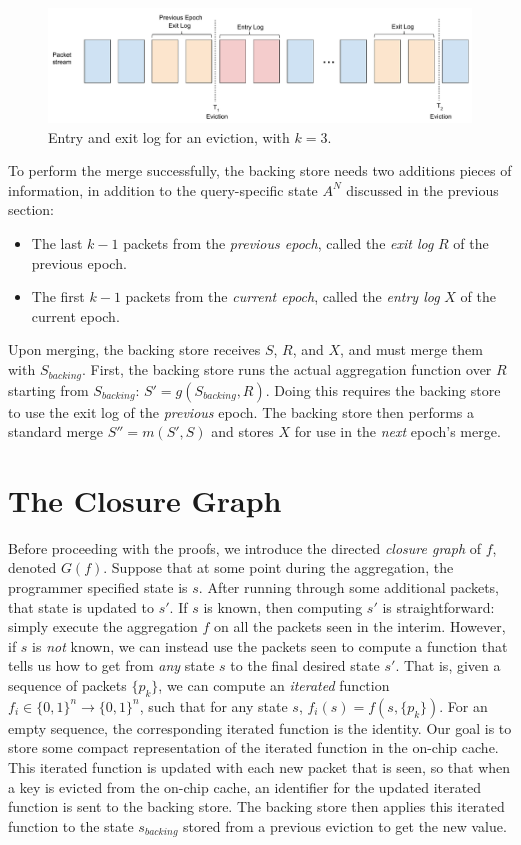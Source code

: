 \begin{figure}[h]
\centering
\includegraphics[width=0.7\linewidth]{pq_merge_tr_bph.pdf}
\caption{Entry and exit log for an eviction, with $k = 3$.}
\label{fig:bph-merge}
\end{figure}

To perform the merge successfully,
the backing
store needs two additions pieces of information, 
in addition to the query-specific state $A^N$ discussed in the previous section:
\begin{itemize}
\item The last $k-1$ packets from the \emph{previous epoch}, called the \emph{exit log} $R$ of the previous epoch.
\item The first $k-1$ packets from the \emph{current epoch}, called the \emph{entry log} $X$ of the current epoch. 
\end{itemize}

Upon merging, the backing store receives $S$, $R$, and $X$, and must merge them with $S_{backing}$. First, the backing store runs the actual aggregation function over $R$ starting from $S_{backing}$: $S' = g(S_{backing}, R)$. Doing this requires the backing store to use the exit log of the \emph{previous} epoch. The backing store then performs a standard merge
 $S'' = m(S', S)$ and stores $X$ for use in the \emph{next} epoch's merge.

\section{The Closure Graph}

Before proceeding with the proofs, we introduce the directed \emph{closure graph} of $f$, denoted $G(f)$. Suppose that at some point during the aggregation, 
the programmer specified state is $s$. After running through some additional packets, that state is updated to $s'$. If $s$ is known, then computing
$s'$ is straightforward: simply execute the aggregation $f$ on all the packets seen in the interim. However, if $s$ is \emph{not} known, we can instead
use the packets seen to compute a function that tells us how to get from \emph{any} state $s$ to the final desired state $s'$. That is, given a sequence of packets $\{p_k\}$,
we can compute an \emph{iterated} function $f_i \in \{0,1\}^n \rightarrow \{0,1\}^n$, such that for any state $s$, $f_i(s) = f(s, \{p_k\})$. For an empty sequence, the corresponding iterated function is the identity.
Our goal is to store some compact representation of the iterated function in the on-chip cache. This iterated function is updated with each new packet that is seen, so that when a key is evicted from the on-chip cache,
an identifier for the updated iterated function is sent to the backing store. The backing store then applies this iterated function to the state $s_{backing}$ stored from a previous eviction to get the new value.

